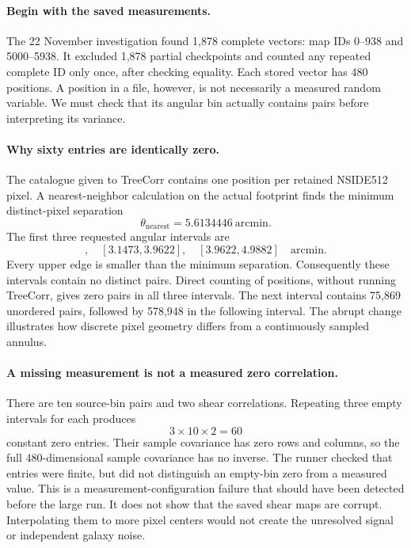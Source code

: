 \documentclass[11pt]{article}
\begin{document}
\paragraph{Begin with the saved measurements.}
The 22 November investigation found 1,878 complete vectors: map IDs
0--938 and 5000--5938. It excluded 1,878 partial checkpoints and counted
any repeated complete ID only once, after checking equality. Each stored
vector has 480 positions. A position in a file, however, is not necessarily
a measured random variable. We must check that its angular bin actually
contains pairs before interpreting its variance.

\paragraph{Why sixty entries are identically zero.}
The catalogue given to TreeCorr contains one position per retained
NSIDE512 pixel. A nearest-neighbor calculation on the actual footprint
finds the minimum distinct-pixel separation
\begin{equation}
 \theta_{\mathrm{nearest}}=5.6134446\ \mathrm{arcmin}.
\end{equation}
The first three requested angular intervals are
\begin{equation}
 [2.5,3.1473],\quad[3.1473,3.9622],\quad[3.9622,4.9882]
 \quad\mathrm{arcmin}.
\end{equation}
Every upper edge is smaller than the minimum separation. Consequently
these intervals contain no distinct pairs. Direct counting of positions,
without running TreeCorr, gives zero pairs in all three intervals. The
next interval contains 75,869 unordered pairs, followed by 578,948 in the
following interval. The abrupt change illustrates how discrete pixel
geometry differs from a continuously sampled annulus.

\paragraph{A missing measurement is not a measured zero correlation.}
There are ten source-bin pairs and two shear correlations. Repeating
three empty intervals for each produces
\begin{equation}
 3\times10\times2=60
\end{equation}
constant zero entries. Their sample covariance has zero rows and columns,
so the full 480-dimensional sample covariance has no inverse. The runner
checked that entries were finite, but did not distinguish an empty-bin
zero from a measured value. This is a measurement-configuration failure
that should have been detected before the large run. It does not show
that the saved shear maps are corrupt. Interpolating them to more pixel
centers would not create the unresolved signal or independent galaxy noise.
\end{document}
